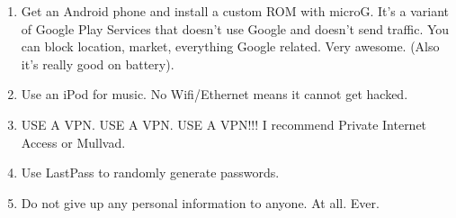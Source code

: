 \documentclass[12pt]{article}
\begin{document}
    \begin{enumerate}
       \item Get an Android phone and install a custom ROM with microG. It's a variant of Google Play Services that doesn't use Google and doesn't send traffic. You can block location, market, everything Google related. Very awesome. (Also it's really good on battery).
       \item Use an iPod for music. No Wifi/Ethernet means it cannot get hacked.
       \item USE A VPN. USE A VPN. USE A VPN!!! I recommend Private Internet Access or Mullvad.
       \item Use LastPass to randomly generate passwords.
       \item Do not give up any personal information to anyone. At all. Ever. 
    \end{enumerate}
\newpage
\onehalfspacing
\end{document}
